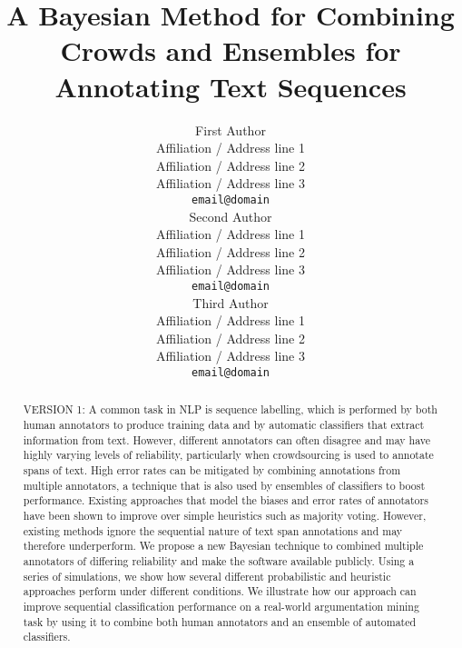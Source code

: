 \documentclass[11pt,a4paper]{article}
\title{A Bayesian Method for Combining Crowds and Ensembles for Annotating Text Sequences}%
\author{First Author \\
  Affiliation / Address line 1 \\
  Affiliation / Address line 2 \\
  Affiliation / Address line 3 \\
  {\tt email@domain} \\\And
  Second Author \\
  Affiliation / Address line 1 \\
  Affiliation / Address line 2 \\
  Affiliation / Address line 3 \\
  {\tt email@domain} \\\And
  Third Author \\
  Affiliation / Address line 1 \\
  Affiliation / Address line 2 \\
  Affiliation / Address line 3 \\
  {\tt email@domain} \\
}
\begin{document}
\maketitle


\begin{abstract}
VERSION 1:
A common task in NLP is sequence labelling, which is performed by both human annotators to 
produce training data and by automatic classifiers that extract information from text.
However, different annotators can often disagree and may have highly varying levels of reliability,
particularly when crowdsourcing is used to annotate spans of text. 
High error rates can be mitigated by combining annotations from multiple annotators,
a technique that is also used by ensembles of classifiers to boost performance.
Existing approaches that model the biases and error rates of annotators have been shown to 
improve over simple heuristics such as majority voting. However, existing methods
ignore the sequential nature of text span annotations and may therefore underperform.
We propose a new Bayesian technique to combined multiple annotators of differing reliability 
and make the software available publicly. 
Using a series of simulations, we show how several different probabilistic
and heuristic approaches perform under different conditions. 
We illustrate how our approach can improve sequential classification performance on a 
real-world argumentation mining task by using it to combine both human annotators and 
an ensemble of automated classifiers.


\end{abstract}
\end{document}
